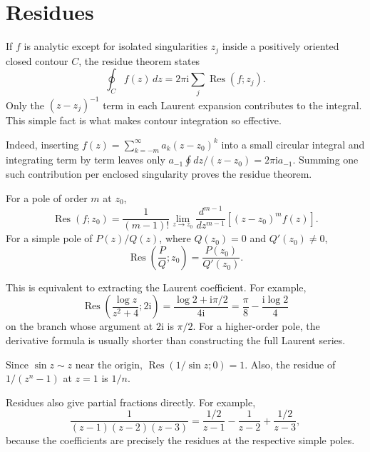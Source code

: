 \section{Residues}

If $f$ is analytic except for isolated singularities $z_j$ inside a positively oriented closed contour $C$, the residue theorem states
\begin{equation}
\oint_Cf(z)\,dz=2\pi\mathrm{i}\sum_j\operatorname{Res}(f;z_j).
\label{eq:ch06-residue-theorem}
\end{equation}
Only the $(z-z_j)^{-1}$ term in each Laurent expansion contributes to the integral. This simple fact is what makes contour integration so effective.

Indeed, inserting $f(z)=\sum_{k=-m}^\infty a_k(z-z_0)^k$ into a small circular integral and integrating term by term leaves only $a_{-1}\oint dz/(z-z_0)=2\pi\mathrm{i}a_{-1}$. Summing one such contribution per enclosed singularity proves the residue theorem.

For a pole of order $m$ at $z_0$,
\begin{equation}
\operatorname{Res}(f;z_0)=\frac{1}{(m-1)!}\lim_{z\to z_0}
\frac{d^{m-1}}{dz^{m-1}}\left[(z-z_0)^mf(z)\right].
\end{equation}
For a simple pole of $P(z)/Q(z)$, where $Q(z_0)=0$ and $Q'(z_0)\ne0$,
\begin{equation}
\operatorname{Res}\left(\frac{P}{Q};z_0\right)=\frac{P(z_0)}{Q'(z_0)}.
\end{equation}

This is equivalent to extracting the Laurent coefficient. For example,
\begin{equation}
\operatorname{Res}\left(\frac{\log z}{z^2+4};2\mathrm{i}\right)
=\frac{\log2+\mathrm{i}\pi/2}{4\mathrm{i}}
=\frac{\pi}{8}-\frac{\mathrm{i}\log2}{4}
\end{equation}
on the branch whose argument at $2\mathrm{i}$ is $\pi/2$. For a higher-order pole, the derivative formula is usually shorter than constructing the full Laurent series.

\begin{example}
Since $\sin z\sim z$ near the origin, $\operatorname{Res}(1/\sin z;0)=1$. Also, the residue of $1/(z^n-1)$ at $z=1$ is $1/n$.
\end{example}

Residues also give partial fractions directly. For example,
\begin{equation}
\frac{1}{(z-1)(z-2)(z-3)}=\frac{1/2}{z-1}-\frac{1}{z-2}+\frac{1/2}{z-3},
\end{equation}
because the coefficients are precisely the residues at the respective simple poles.

